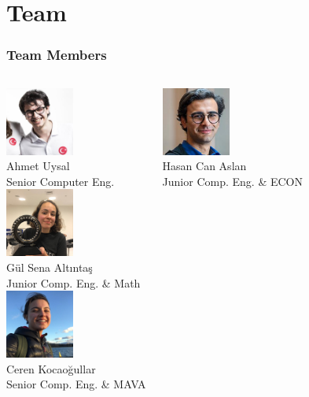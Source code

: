   \section{Team}
    \begin{frame}
      \frametitle{Team Members}
      \begin{columns}
				\column{5cm}
				\centering 
					\includegraphics[width=2.25cm]{images/ahmet.jpg}\\
					Ahmet Uysal\\
					Senior Computer Eng.\\

          \includegraphics[width=2.25cm]{images/gulsena.jpg}\\
					Gül Sena Altıntaş\\
					Junior Comp. Eng. \& Math\\
				\column{5cm}
				\centering
					\includegraphics[width=2.25cm]{images/ceren.jpg}\\
					Ceren Kocaoğullar\\
					Senior Comp. Eng. \& MAVA
          
          \includegraphics[width=2.25cm]{images/hasancan.jpg}\\
					Hasan Can Aslan\\
					Junior Comp. Eng. \& ECON
			\end{columns}
    
    \end{frame}



